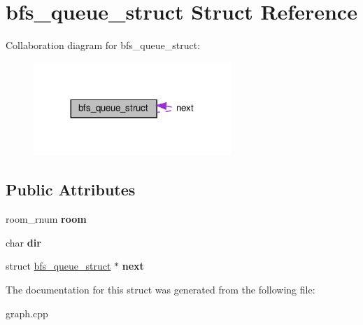 \hypertarget{structbfs__queue__struct}{}\section{bfs\+\_\+queue\+\_\+struct Struct Reference}
\label{structbfs__queue__struct}


Collaboration diagram for bfs\+\_\+queue\+\_\+struct\+:
\nopagebreak
\begin{figure}[H]
\begin{center}
\leavevmode
\includegraphics[width=212pt]{structbfs__queue__struct__coll__graph}
\end{center}
\end{figure}
\subsection*{Public Attributes}
\begin{DoxyCompactItemize}
\item 
\mbox{\label{structbfs__queue__struct_ab8e2b9e326bc534284444c6a05fea88a}} 
room\+\_\+rnum {\bfseries room}
\item 
\mbox{\label{structbfs__queue__struct_a1b4779043921027a162a4679d60a470c}} 
char {\bfseries dir}
\item 
\mbox{\label{structbfs__queue__struct_a59db314a224e075250cb76a491d4ee8c}} 
struct \hyperlink{structbfs__queue__struct}{bfs\+\_\+queue\+\_\+struct} $\ast$ {\bfseries next}
\end{DoxyCompactItemize}


The documentation for this struct was generated from the following file\+:\begin{DoxyCompactItemize}
\item 
graph.\+cpp\end{DoxyCompactItemize}
